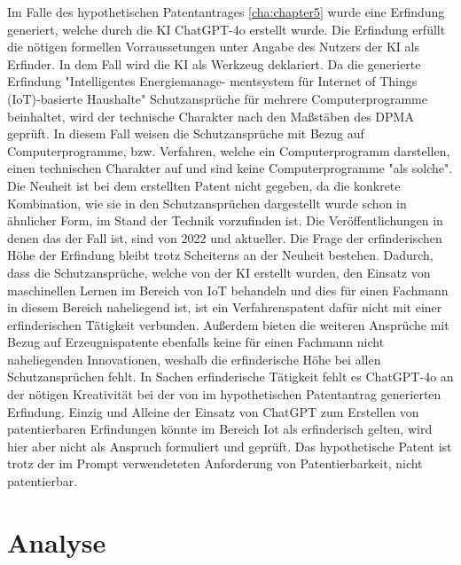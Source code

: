 Im Falle des hypothetischen Patentantrages \ref{cha:chapter5}
wurde eine Erfindung generiert, welche durch die KI ChatGPT-4o
erstellt wurde.
Die Erfindung erfüllt die nötigen formellen Vorraussetungen
unter Angabe des Nutzers der KI als Erfinder. In dem Fall
wird die KI als Werkzeug deklariert.
Da die generierte Erfindung "Intelligentes Energiemanage-
mentsystem für Internet of Things (IoT)-basierte Haushalte"
Schutzansprüche für mehrere Computerprogramme beinhaltet, 
wird der technische Charakter nach den Maßstäben des DPMA geprüft.
In diesem Fall weisen die Schutzansprüche mit 
Bezug auf Computerprogramme, bzw. Verfahren,
welche ein Computerprogramm darstellen, 
einen technischen Charakter auf und
sind keine Computerprogramme "als solche".
Die Neuheit ist bei dem erstellten Patent nicht gegeben,
da die konkrete Kombination, wie sie in den Schutzansprüchen
dargestellt wurde schon in ähnlicher Form, im Stand der Technik vorzufinden ist.
Die Veröffentlichungen in denen das der Fall ist, sind von 2022 und 
aktueller.
Die Frage der erfinderischen Höhe der
Erfindung bleibt trotz Scheiterns an der Neuheit  bestehen.
Dadurch, dass die Schutzansprüche, welche von der KI
erstellt wurden, den Einsatz von maschinellen
Lernen im Bereich von IoT behandeln und dies
für einen Fachmann in diesem Bereich naheliegend
ist, ist ein Verfahrenspatent dafür nicht mit einer
erfinderischen Tätigkeit verbunden.
Außerdem bieten die weiteren Ansprüche mit Bezug auf 
Erzeugnispatente ebenfalls keine
für einen Fachmann nicht naheliegenden Innovationen,
weshalb die erfinderische Höhe bei allen Schutzansprüchen fehlt.
In Sachen erfinderische Tätigkeit 
fehlt es ChatGPT-4o an der nötigen Kreativität bei 
der von im hypothetischen Patentantrag generierten Erfindung.
Einzig und Alleine der Einsatz von ChatGPT zum Erstellen
von patentierbaren Erfindungen könnte im Bereich Iot 
als erfinderisch gelten, wird hier aber nicht als Anspruch
formuliert und geprüft.
Das hypothetische Patent ist trotz der im Prompt 
verwendeteten Anforderung von Patentierbarkeit,
nicht patentierbar. 
\section{Analyse}

